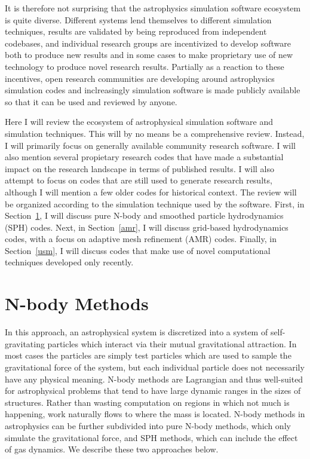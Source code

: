 \documentclass[11pt,twoside]{article}
\begin{document}
It is therefore not surprising that the astrophysics simulation software ecosystem is quite diverse. Different systems lend themselves to different simulation techniques, results are validated by being reproduced from independent codebases, and individual research groups are incentivized to develop software both to produce new results and in some cases to make proprietary use of new technology to produce novel research results. Partially as a reaction to these incentives, open research communities are developing around astrophysics simulation codes and inclreasingly simulation software is made publicly available so that it can be used and reviewed by anyone.

Here I will review the ecosystem of astrophysical simulation software and simulation techniques. This will by no means be a comprehensive review. Instead, I will primarily focus on generally available community research software. I will also mention several propietary research codes that have made a substantial impact on the research landscape in terms of published results. I will also attempt to focus on codes that are still used to generate research results, although I will mention a few older codes for historical context. The review will be organized according to the simulation technique used by the software. First, in Section~\ref{nbody}, I will discuss pure N-body and smoothed particle hydrodynamics (SPH) codes. Next, in Section~\ref{amr}, I will discuss grid-based hydrodynamics codes, with a focus on adaptive mesh refinement (AMR) codes. Finally, in Section~\ref{usm}, I will discuss codes that make use of novel computational techniques developed only recently.

\section{N-body Methods}
\label{nbody}

In this approach, an astrophysical system is discretized into a system of self-gravitating particles which interact via their mutual gravitational attraction. In most cases the particles are simply test particles which are used to sample the gravitational force of the system, but each individual particle does not necessarily have any physical meaning. N-body methods are Lagrangian and thus well-suited for astrophysical problems that tend to have large dynamic ranges in the sizes of structures. Rather than wasting computation on regions in which not much is happening, work naturally flows to where the mass is located. N-body methods in astrophysics can be further subdivided into pure N-body methods, which only simulate the gravitational force, and SPH methods, which can include the effect of gas dynamics. We describe these two approaches below.
\end{document}
